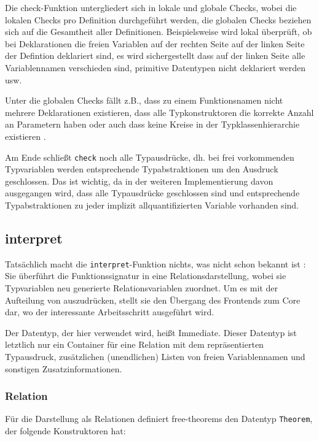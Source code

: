 \documentclass[11pt]{article} %
\begin{document}
Die check-Funktion untergliedert sich in lokale und globale Checks, wobei die lokalen Checks pro Definition durchgeführt werden, die globalen Checks beziehen sich auf die Gesamtheit aller Definitionen. Beispielsweise wird lokal überprüft, ob bei Deklarationen die freien Variablen auf der rechten Seite auf der linken Seite der Defintion deklariert sind, es wird sichergestellt
dass auf der linken Seite alle Variablennamen verschieden sind, primitive Datentypen nicht deklariert werden usw.

Unter die globalen Checks fällt z.B., dass zu einem Funktionsnamen nicht mehrere Deklarationen existieren, dass alle Typkonstruktoren die korrekte Anzahl an Parametern haben oder auch dass keine Kreise in der Typklassenhierarchie existieren \cite{freetheorems}.

Am Ende schließt \texttt{check} noch alle Typausdrücke, dh. bei frei vorkommenden Typvariablen werden entsprechende Typabstraktionen um den Ausdruck geschlossen. Das ist wichtig, da in der weiteren Implementierung davon ausgegangen wird, dass alle Typausdrücke geschlossen sind und entsprechende Typabstraktionen zu jeder implizit allquantifizierten Variable vorhanden sind.

\subsection{interpret}

Tatsächlich macht die \texttt{interpret}-Funktion nichts, was nicht schon bekannt ist : Sie überführt die Funktionssignatur in eine
Relationsdarstellung, wobei sie Typvariablen neu generierte Relationsvariablen zuordnet. Um es mit der Aufteilung von \cite{freetheorems} auszudrücken, stellt sie den Übergang des Frontends zum Core dar, wo der interessante Arbeitsschritt ausgeführt wird.

Der Datentyp, der hier verwendet wird, heißt Immediate. Dieser Datentyp ist letztlich nur ein Container für eine Relation mit
dem repräsentierten Typausdruck, zusätzlichen (unendlichen) Listen von freien Variablennamen und sonstigen Zusatzinformationen.

\subsubsection{Relation}

Für die Darstellung als Relationen definiert free-theorems den Datentyp \texttt{Theorem}, der folgende Konstruktoren hat:
\end{document}
